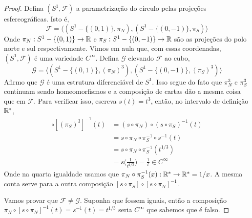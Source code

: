 \begin{proof}
    Defina $(S^1, \mathcal{F})$ a parametrização do círculo pelas projeções esfereográficas. Isto é,
    $$\mathcal{F} = \langle (S^1 - \{(0,1)\}, \pi_N), (S^1 - \{(0,-1)\}, \pi_S)\rangle$$
    Onde $\pi_N : S^1 - \{(0,1)\} \rightarrow \mathbb{R}$ e $\pi_S : S^1 - \{(0,-1)\} \rightarrow \mathbb{R}$ são as projeções do polo norte e sul respectivamente. Vimos em aula que, com
    essas coordenadas, $(S^1, \mathcal{F})$ é uma variedade $C^\infty$. Defina $\mathcal{G}$ elevando $\mathcal{F}$ ao cubo,
    $$\mathcal{G} = \langle(S^1 - \{(0,1)\}, (\pi_N)^3), (S^1 - \{(0,-1)\}, (\pi_S)^3)\rangle$$
    Afirmo que $\mathcal{G}$ é uma estrutura diferenciável de $S^1$. Isso segue do fato que $\pi_N^3$ e $\pi_S^3$ continuam sendo homeomorfismos 
    e a composição de cartas dão a mesma coisa que em $\mathcal{F}$. Para verificar isso, escreva $s(t) = t^3$, então, no intervalo de definição $\mathbb{R}^*$,
    \begin{align*}
        [(\pi_N)^{3}] \circ [(\pi_S)^{3}]^{-1} (t) &= (s\circ \pi_N) \circ (s \circ \pi_S)^{-1} (t)\\
                                                   &= s \circ \pi_N \circ \pi_S^{-1} \circ s^{-1} (t) \\
                                                   &= s \circ \pi_N \circ \pi_S^{-1} (t^{1/3})\\
                                                   &= s\bigg(\frac{1}{t^{1/3}}\bigg) = \frac{1}{t} \in C^{\infty}
    \end{align*}
    Onde na quarta igualdade usamos que $\pi_N \circ \pi_S^{-1}(x) : \mathbb{R}^* \rightarrow \mathbb{R}^* = 1/x$. A mesma conta serve para a outra composição $[s\circ \pi_S] \circ [s \circ \pi_N]^{-1}$.

    Vamos provar que $\mathcal{F} \neq \mathcal{G}$. Suponha que fossem iguais, então a composição $\pi_N \circ [s \circ \pi_N]^{-1} (t) = s^{-1} (t) = t^{1/3}$ 
    seria $C^{\infty}$ que sabemos que é falso. 


\end{proof}
